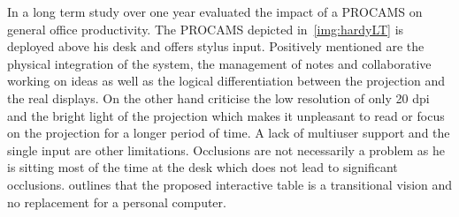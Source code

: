 In a long term study over one year \textcite{Hardy:2012ej} evaluated the impact of a \ac{PROCAMS} on general office productivity. The \ac{PROCAMS} depicted in~\autoref{img:hardyLT} is deployed above his desk and offers stylus input. Positively mentioned are the physical integration of the system, the management of notes and collaborative working on ideas as well as the logical differentiation between the projection and the real displays. On the other hand \citeauthor{Hardy:2012ej} criticise the low resolution of only 20 dpi and the bright light of the projection which makes it unpleasant to read or focus on the projection for a longer period of time. A lack of multiuser support and the single input are other limitations. Occlusions are not necessarily a problem as he is sitting most of the time at the desk which does not lead to significant occlusions.
\citeauthor{Hardy:2012ej} outlines that the proposed interactive table is a transitional vision and no replacement for a personal computer. 

